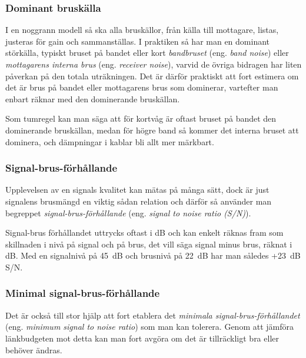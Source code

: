 \subsubsection{Dominant bruskälla}

I en noggrann modell så ska alla bruskällor, från källa till mottagare,
listas, justeras för gain och sammanställas.
I praktiken så har man en dominant störkälla, typiskt bruset på bandet eller
kort \emph{bandbruset} (eng. \emph{band noise}) eller
\emph{mottagarens interna brus} (eng. \emph{receiver noise}),
varvid de övriga bidragen har liten påverkan på den totala uträkningen.
Det är därför praktiskt att fort estimera om det är brus på bandet eller
mottagarens brus som dominerar, vartefter man enbart räknar med den
dominerande bruskällan.

Som tumregel kan man säga att för kortvåg är oftast bruset på bandet
den dominerande bruskällan, medan för högre band så kommer det interna
bruset att dominera, och dämpningar i kablar bli allt mer märkbart.

\subsubsection{Signal-brus-förhållande}

Upplevelsen av en signals kvalitet kan mätas på många sätt, dock är just
signalens brusmängd en viktig sådan relation och därför så använder man
begreppet \emph{signal-brus-förhållande} (eng.
\emph{signal to noise ratio (S/N)}).

Signal-brus förhållandet uttrycks oftast i dB och kan enkelt räknas fram som
skillnaden i nivå på signal och på brus, det vill säga signal minus brus,
räknat i dB.
Med en signalnivå på 45~dB och brusnivå på 22~dB har man således +23~dB S/N.

\subsubsection{Minimal signal-brus-förhållande}

Det är också till stor hjälp att fort etablera det \emph{minimala
signal-brus-förhållandet} (eng. \emph{minimum signal to noise ratio})
som man kan tolerera.
Genom att jämföra länkbudgeten mot detta kan man fort avgöra om det är
tillräckligt bra eller behöver ändras.

